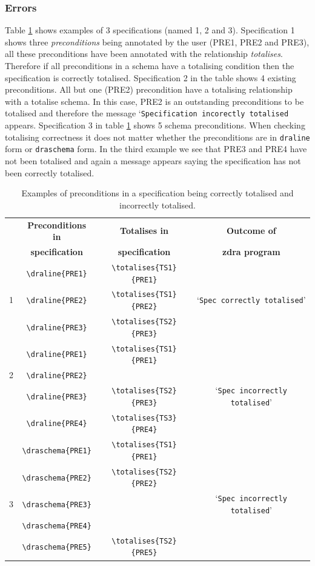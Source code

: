 \subsubsection{Errors}
\label{subsubsec:zdra_toterrors}

Table \ref{tab:totalisecorrect} shows examples of 3 specifications (named 1, 2 and 3). Specification 1 shows three \emph{preconditions} being annotated by the user (PRE1, PRE2 and PRE3), all these preconditions have been annotated with the relationship \emph{totalises}. Therefore if all preconditions in a schema have a totalising condition then the specification is correctly totalised. Specification 2 in the table shows 4 existing preconditions. All but one (PRE2) precondition have a totalising relationship with a totalise schema. In this case, PRE2 is an outstanding preconditions to be totalised and therefore the message `\texttt{Specification incorectly totalised} appears. Specification 3 in table \ref{tab:totalisecorrect} shows 5 schema preconditions. When checking totalising correctness it does not matter whether the preconditions are in \verb|draline| form or \verb|draschema| form. In the third example we see that PRE3 and PRE4 have not been totalised and again a message appears saying the specification has not been correctly totalised.

\begin{table}[H]
\begin{tabular}{|c|c|c|c|}
\hline
& \textbf{Preconditions in} & \textbf{Totalises in} & \textbf{Outcome of} \\
& \textbf{specification} & \textbf{specification} & \textbf{\gls{zdra} program} \\
\hline
\hline
& \verb|\draline{PRE1}| & \verb|\totalises{TS1}{PRE1}| & \\
1 & \verb|\draline{PRE2}| & \verb|\totalises{TS1}{PRE2}| & `\texttt{Spec correctly totalised}' \\
& \verb|\draline{PRE3}| & \verb|\totalises{TS2}{PRE3}|& \\
\hline
& \verb|\draline{PRE1}| & \verb|\totalises{TS1}{PRE1}| &  \\
2 & \verb|\draline{PRE2}| & & \\
& \verb|\draline{PRE3}| & \verb|\totalises{TS2}{PRE3}|& `\texttt{Spec incorrectly totalised}' \\
& \verb|\draline{PRE4}| & \verb|\totalises{TS3}{PRE4}|& \\
\hline
& \verb|\draschema{PRE1}| & \verb|\totalises{TS1}{PRE1}| &  \\
 & \verb|\draschema{PRE2}| & \verb|\totalises{TS2}{PRE2}| & \\
3 & \verb|\draschema{PRE3}| & & `\texttt{Spec incorrectly totalised}' \\
& \verb|\draschema{PRE4}| & & \\
& \verb|\draschema{PRE5}| & \verb|\totalises{TS2}{PRE5}|  & \\
\hline
\end{tabular}
\caption{\label{tab:totalisecorrect} Examples of preconditions in a specification being correctly totalised and incorrectly totalised.}
\end{table}

